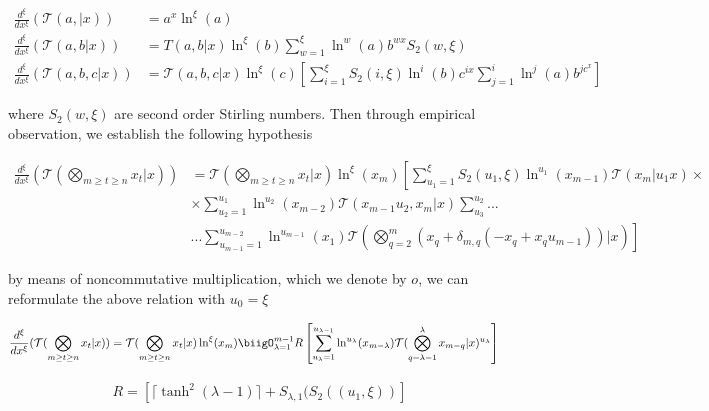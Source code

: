 \begin{align}
        \frac{d^\xi}{dx^\xi}(\mathcal{T}(a,| x) ) &=a^x \ln^\xi(a)\\
        \frac{d^\xi}{dx^\xi}(\mathcal{T}(a, b | x) ) &= T(a, b |x) 
        \ln^\xi(b) \sum_{w=1}^\xi \ln^w(a) b^{wx} S_2(w, \xi) \\
        \frac{d^\xi}{dx^\xi}(\mathcal{T}(a, b, c | x) ) &= \mathcal{T}
        (a, b, c | x) \ln^\xi(c) \left[ \sum_{i=1}^\xi S_2(i, \xi) 
        \ln^i(b)c^{ix} \sum_{j=1}^i \ln^j(a) b^{jc^x}\right]
\end{align}

where \(S_2(w, \xi)\) are second order Stirling numbers. Then through
empirical observation, we establish the following hypothesis

\begin{theorem}
        \begin{align}
                \frac{d^\xi}{dx^\xi}(\mathcal{T}(\bigotimes_{m \geq 
                t \geq n}x_t | x) ) &= \mathcal{T}(\bigotimes_{m \geq 
                t \geq n}x_t| x) \ln^\xi (x_m) \left[\sum_{u_1 = 1}^\xi
                S_2(u_1, \xi) \ln^{u_1}(x_{m-1}) \mathcal{T}(x_{m}| u_1 
                x) \times \right. \\ & \left. \times \sum_{u_2 = 1}^{u_1}
                \ln^{u_2}(x_{m-2}) \mathcal{T}(x_{m-1} u_2, x_m |x) 
                \sum_{u_3}^{u_2}...\right. \\ & ... \left. \sum_{u_{m-1}
                =1}^{u_{m-2}}\ln^{u_{m-1}}(x_1)\mathcal{T}(\bigotimes_{q
                =2}^m (x_q + \delta_{m, q}(-x_q + x_q u_{m-1})) |x)\right]
        \end{align}

        by means of noncommutative multiplication, which we denote by 
        \(o\), we can reformulate the above relation with \(u_0 = \xi\)
        
        \begin{align}
                \frac{d^\xi}{dx^\xi}(\mathcal{T}(\bigotimes_{m \geq 
                t \geq n}x_t | x) ) &= \mathcal{T}(\bigotimes_{m \geq 
                t \geq n}x_t| x) \ln^\xi (x_m) \biigO_{\lambda = 1}^{m-1}
                R\left[\sum_{u_{\lambda}=1}^{u_{\lambda-1}}\ln^{u_{\lambda}}
                (x_{m-\lambda}) \mathcal{T}(\bigotimes_{q = \lambda-1}^\lambda 
                x_{m-q} |x)^{u_{\lambda}} \right]
                \label{w}
        \end{align}
        
        \begin{align}
                R=\left[ \lceil \tanh^2(\lambda -1)\rceil+S_{\lambda, 1}(S_2((u_1, \xi))\right]
        \end{align}
\end{theorem}

